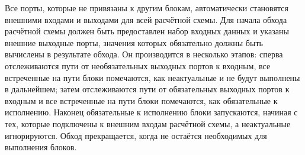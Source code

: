 Все порты, которые не привязаны к другим блокам, автоматически становятся внешними входами и выходами для всей расчётной схемы. Для начала обхода расчётной схемы должен быть предоставлен набор входных данных и указаны внешние выходные порты, значения которых обязательно должны быть вычислены в результате обхода. Он производится в несколько этапов: сперва отслеживаются пути от необязательных выходных портов к входным, все встреченные на пути блоки помечаются, как неактуальные и не будут выполнены в дальнейшем; затем отслеживаются пути от обязательных выходных портов к входным и все встреченные на пути блоки помечаются, как обязательные к исполнению. Наконец обязательные к исполнению блоки запускаются, начиная с тех, которые подключены к внешним входам расчётной схемы, а неактуальные игнорируются. Обход прекращается, когда не остаётся необходимых для выполнения блоков. \cite{Nazarenko2015}

\newpage
